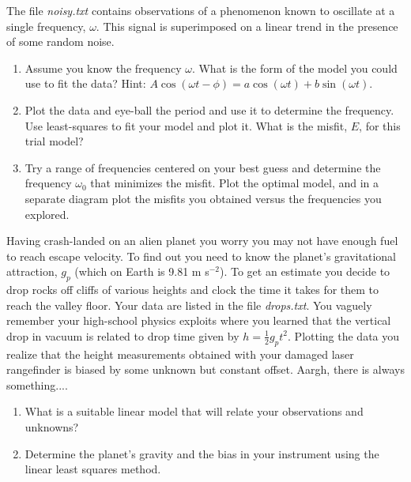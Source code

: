 \begin{problem}
	\setcounter{noisyc}{\thechapter}
	\setcounter{noisyp}{\theproblem}
The file \emph{noisy.txt} contains observations of a phenomenon known to oscillate at a single frequency, $\omega$.
This signal is superimposed on a linear trend in the presence of some random noise.
\begin{enumerate}[label=\alph*)]
	\item Assume you know the frequency $\omega$. What is the form of the model you could use to fit the data?
	Hint: $A\cos(\omega t - \phi) = a \cos(\omega t) + b \sin(\omega t)$.
	\item Plot the data and eye-ball the period and use it to determine the frequency.  Use least-squares to fit your
	model and plot it.  What is the misfit, $E$, for this trial model?
	\item Try a range of frequencies centered on your best guess and determine the frequency $\omega_0$ that minimizes
	the misfit.  Plot the optimal model, and in a separate diagram plot the misfits you obtained versus the frequencies
	you explored.
\end{enumerate}
\end{problem}

\begin{problem}
Having crash-landed on an alien planet you worry you may not have enough fuel to reach escape velocity.  To find out you
need to know the planet's gravitational attraction, $g_p$ (which on Earth is 9.81 m s$^{-2}$).  To get an estimate you decide
to drop rocks off cliffs of various heights and clock the time it takes for them to reach the valley floor.  Your data
are listed in the file \emph{drops.txt}.  You vaguely remember your high-school physics exploits where you learned that the vertical drop in vacuum
is related to drop time given by $h = \frac{1}{2}g_p t^2$.  Plotting the data you realize that the height measurements obtained with your damaged laser
rangefinder is biased by some unknown but constant offset.  Aargh, there is always something....
\begin{enumerate}[label=\alph*)]
	\item What is a suitable linear model that will relate your observations and unknowns?
	\item Determine the planet's gravity and the bias in your instrument using the linear least squares method.
\end{enumerate}
\end{problem}

